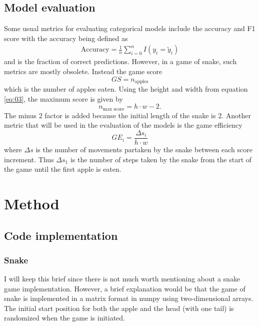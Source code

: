 \documentclass[%
 uio,
 jmp,
 amsmath,amssymb,
 reprint, nofootinbib]{revtex4-1}
\numberwithin{equation}{section}
\begin{document}
\subsection{Model evaluation}

Some usual metrics for evaluating categorical models include the accuracy and F1 score with the accuracy being defined as
\begin{align}
\text{Accuracy} = \frac{1}{n}\sum_{i=0}^nI(y_i = \tilde{y}_i)
\end{align}
and is the fraction of correct predictions. However, in a game of snake, such metrics are mostly obsolete. Instead the game score
\begin{equation}
GS = n_\text{apples}
\end{equation}
which is the number of apples eaten. Using the height and width from equation \ref{eq:03}, the maximum score is given by
\begin{equation}\label{eq:11}
n_{\text{max score}} = h\cdot w - 2.
\end{equation}
The minus 2 factor is added because the initial length of the snake is 2. Another metric that will be used in the evaluation of the models is the game efficiency
\begin{equation}\label{eq:12}
GE_i = \frac{\Delta s_i}{h\cdot w}
\end{equation}
where \(\Delta s\) is the number of movements partaken by the snake between each score increment. Thus \(\Delta s_1\) is the number of steps taken by the snake from the start of the game until the first apple is eaten.


\section{Method}\label{sec:Method}

\subsection{Code implementation}

\subsubsection{Snake}

I will keep this brief since there is not much worth mentioning about a snake game implementation. However, a brief explanation would be that the game of snake is implemented in a matrix format in numpy using two-dimensional arrays. The initial start position for both the apple and the head (with one tail) is randomized when the game is initiated.
\end{document}
